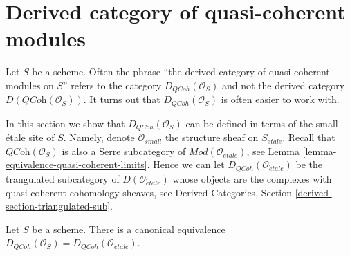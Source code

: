\section{Derived category of quasi-coherent modules}
\label{section-derived-quasi-coherent}

\noindent
Let $S$ be a scheme. Often the phrase ``the derived category of quasi-coherent
modules on $S$'' refers to the category $D_{QCoh}(\mathcal{O}_S)$ and not
the derived category $D(\textit{QCoh}(\mathcal{O}_S))$. It turns
out that $D_{QCoh}(\mathcal{O}_S)$ is often easier to work with.

\medskip\noindent
In this section we show that $D_{QCoh}(\mathcal{O}_S)$ can be defined in terms
of the small \'etale site of $S$. Namely, denote $\mathcal{O}_{small}$
the structure sheaf on $S_{\acute{e}tale}$. Recall that
$\textit{QCoh}(\mathcal{O}_S)$ is also a Serre subcategory of
$\textit{Mod}(\mathcal{O}_{\acute{e}tale})$, see
Lemma \ref{lemma-equivalence-quasi-coherent-limits}.
Hence we can let $D_{QCoh}(\mathcal{O}_{\acute{e}tale})$ be the trangulated
subcategory of $D(\mathcal{O}_{\acute{e}tale})$ whose objects are the
complexes with quasi-coherent cohomology sheaves, see
Derived Categories, Section \ref{derived-section-triangulated-sub}.

\begin{lemma}
\label{lemma-derived-quasi-coherent-small-etale-site}
Let $S$ be a scheme. There is a canonical equivalence
$D_{QCoh}(\mathcal{O}_S) = D_{QCoh}(\mathcal{O}_{\acute{e}tale})$.
\end{lemma}


